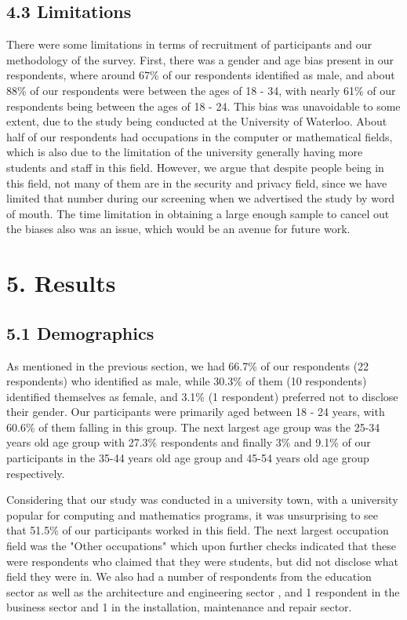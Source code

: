 \documentclass{sigchi}
\begin{document}
\subsection{4.3 Limitations}

There were some limitations in terms of recruitment of participants and our methodology of the survey. First, there was a gender and age bias present in our respondents, where around 67\% of our respondents identified as male, and about 88\% of our respondents were between the ages of 18 - 34, with nearly 61\% of our respondents being between the ages of 18 - 24. This bias was unavoidable to some extent, due to the study being conducted at the University of Waterloo. About half of our respondents had occupations in the computer or mathematical fields, which is also due to the limitation of the university generally having more students and staff in this field. However, we argue that despite people being in this field, not many of them are in the security and privacy field, since we have limited that number during our screening when we advertised the study by word of mouth. The time limitation in obtaining a large enough sample to cancel out the biases also was an issue, which would be an avenue for future work.

\section{5. Results}

\subsection{5.1 Demographics}

As mentioned in the previous section, we had 66.7\% of our respondents (22 respondents) who identified as male, while 30.3\% of them (10 respondents) identified themselves as female, and 3.1\% (1 respondent)  preferred not to disclose their gender. Our participants were primarily aged between 18 - 24 years, with 60.6\% of them falling in this group. The next largest age group was the 25-34 years old age group with 27.3\% respondents and finally 3\% and 9.1\% of our participants in the 35-44 years old age group and 45-54 years old age group respectively.

Considering that our study was conducted in a university town, with a university popular for computing and mathematics programs, it was unsurprising to see that 51.5\% of our participants worked in this field. The next largest occupation field was the "Other occupations" which upon further checks indicated that these were respondents who claimed that they were students, but did not disclose what field they were in. We also had a number of respondents from the education sector as well as the architecture and engineering sector , and 1 respondent in the business sector and 1 in the installation, maintenance and repair sector.
\end{document}
